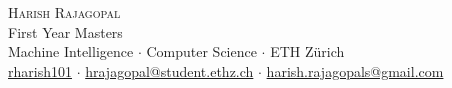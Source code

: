 \newcommand{\sep}{$\cdot$}%
\newcommand{\gmail}{harish.rajagopals@gmail.com}
\newcommand{\ethzmail}{hrajagopal@student.ethz.ch}

\begin{center}

\textsc{\huge Harish Rajagopal}\\[2mm]
First Year Masters\\[1mm]
Machine Intelligence \sep{} Computer Science \sep{} ETH Zürich\\[1mm]
\faGithub{} \href{https://github.com/rharish101}{rharish101} \sep{}
\faEnvelopeO{} \href{mailto:\ethzmail}{\ethzmail} \sep{}
\faEnvelopeO{} \href{mailto:\gmail}{\gmail}

\end{center}
